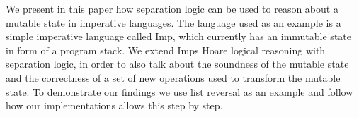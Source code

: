 We present in this paper how separation logic can be used to reason about a mutable state in imperative languages. The language used as an example is a simple imperative language called Imp, which currently has an immutable state in form of a program stack. We extend Imps Hoare logical reasoning with separation logic, in order to also talk about the soundness of the mutable state and the correctness of a set of new operations used to transform the mutable state. To demonstrate our findings we use list reversal as an example and follow how our implementations allows this step by step.